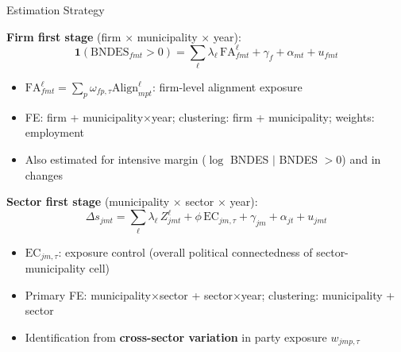 \documentclass[aspectratio=169,11pt]{beamer}
\newcommand{\Align}{\mathrm{Align}}
\newcommand{\FA}{\mathrm{FA}}
\newcommand{\EC}{\mathrm{EC}}
\begin{document}
\begin{frame}{Estimation Strategy}

\textbf{Firm first stage} (firm $\times$ municipality $\times$ year):
\begin{equation*}
    \mathbf{1}(\text{BNDES}_{fmt} > 0) = \sum_\ell \lambda_\ell\, \FA^\ell_{fmt}
    + \gamma_f + \alpha_{mt} + u_{fmt}
\end{equation*}
\begin{itemize}
    \item $\FA^\ell_{fmt} = \sum_p \omega_{fp,\tau} \Align^\ell_{mpt}$: firm-level alignment exposure
    \item FE: firm + municipality$\times$year; clustering: firm + municipality; weights: employment
    \item Also estimated for intensive margin ($\log$ BNDES $|$ BNDES $> 0$) and in changes
\end{itemize}

\medskip

\textbf{Sector first stage} (municipality $\times$ sector $\times$ year):
\begin{equation*}
    \Delta s_{jmt} = \sum_\ell \lambda_\ell\, Z^\ell_{jmt} + \phi\,\EC_{jm,\tau} + \gamma_{jm} + \alpha_{jt} + u_{jmt}
\end{equation*}
\begin{itemize}
    \item $\EC_{jm,\tau}$: exposure control (overall political connectedness of sector-municipality cell)
    \item Primary FE: municipality$\times$sector + sector$\times$year; clustering: municipality + sector
    \item Identification from \textbf{cross-sector variation} in party exposure $w_{jmp,\tau}$
\end{itemize}

\end{frame}
\end{document}
